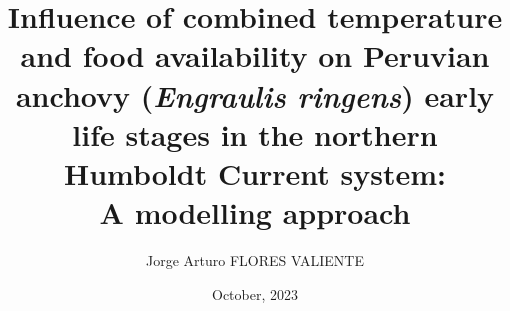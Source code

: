 \documentclass[a4paper,12pt]{book} %
\author{Jorge Arturo FLORES VALIENTE}
\title{Influence of combined temperature and food availability on Peruvian anchovy (\textit{Engraulis ringens}) early life stages in the northern Humboldt Current system:\\A modelling approach}
\date{October, 2023}
\begin{document}
\frontmatter
%
\tableofcontents
\listoftables
%
%

%

\mainmatter
\linenumbers


%
%
%
\nolinenumbers

\backmatter

\renewcommand\bibname{References} %

%


\printnoidxglossary
\end{document}
